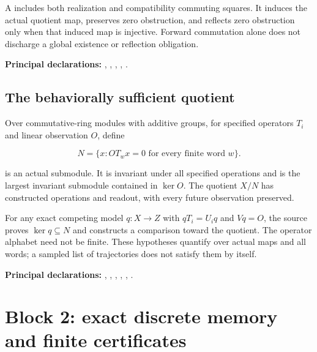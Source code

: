 \documentclass[11pt]{article}
\begin{document}
A \texttt{} includes both
realization and compatibility commuting squares. It induces the actual
quotient map, preserves zero obstruction, and reflects zero obstruction
only when that induced map is injective. Forward commutation alone does
not discharge a global existence or reflection obligation.

\textbf{Principal declarations:}
\texttt{},
\texttt{},
\texttt{},
\texttt{},
\texttt{}.

\hypertarget{the-behaviorally-sufficient-quotient}{%
\subsection{The behaviorally sufficient
quotient}\label{the-behaviorally-sufficient-quotient}}

Over commutative-ring modules with additive groups, for specified
operators \(T_i\) and linear observation \(O\), define

\[
N=\{x:OT_wx=0\text{ for every finite word }w\}.
\]

\texttt{} is an actual submodule.
It is invariant under all specified operations and is the largest
invariant submodule contained in \(\ker O\). The quotient \(X/N\) has
constructed operations and readout, with every future observation
preserved.

For any exact competing model \(q:X\to Z\) with \(qT_i=U_iq\) and
\(Vq=O\), the source proves \(\ker q\subseteq N\) and constructs a
comparison toward the quotient. The operator alphabet need not be
finite. These hypotheses quantify over actual maps and all words; a
sampled list of trajectories does not satisfy them by itself.

\textbf{Principal declarations:}
\texttt{},
\texttt{},
\texttt{},
\texttt{},
\texttt{},
\texttt{}.

\hypertarget{block-2-exact-discrete-memory-and-finite-certificates}{%
\section{Block 2: exact discrete memory and finite
certificates}\label{block-2-exact-discrete-memory-and-finite-certificates}}
\end{document}
